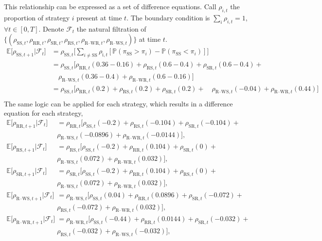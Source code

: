 This relationship can be expressed as a set of difference equations. Call $\rho_{i,t}$ the proportion of strategy $i$ present at time $t$. The boundary condition is $\sum_i \rho_{i,t}= 1$, $\forall t \in [0,T]$. Denote $\mathcal F_{t}$ the natural filtration of $\{(\rho_{\text{SS},t}, \rho_{\text{RR},t}, \rho_{\text{SR},t}, \rho_{\text{RS},t}, \rho_{\text{R--WR},t}, \rho_{\text{R--WS},t} ) \}$ at time $t$.  \\
\begin{align*}
    \mathbb E \big [\rho_{\text{SS},t+1}| \mathcal F_t \big ] &= \rho_{\text{SS},t} \Bigg [\sum_{ i \neq \text{SS}}  \rho_{\text{i},t} [\mathbb P (\pi_\text{SS} > \pi_{i}) -\mathbb P (\pi_\text{SS} < \pi_{i}) ] \Bigg ] \\
    &= \rho_{\text{SS},t}\Bigg [\rho_{\text{RR}, t}(0.36-0.16) + \rho_{\text{RS}, t}(0.6-0.4) + \rho_{\text{SR}, t}(0.6-0.4) + \\
     & \quad \rho_{\text{R--WS}, t}(0.36-0.4) + \rho_{\text{R--WR}, t}(0.6-0.16) \Bigg ] \\
    &= \rho_{\text{SS},t}\Bigg [\rho_{\text{RR}, t}(0.2) + \rho_{\text{RS}, t}(0.2) + \rho_{\text{SR}, t}(0.2) + 
      \quad \rho_{\text{R--WS}, t}(-0.04) + \rho_{\text{R--WR}, t}(0.44) \Bigg ] \\
\end{align*}
The same logic can be applied for each strategy, which results in a difference equation for each strategy, \\
\begin{align*}
    \mathbb E \big [\rho_{\text{RR},t+1}| \mathcal F_t \big ] &=\rho_{\text{RR},t}\Bigg [\rho_{\text{SS}, t}(-0.2) + \rho_{\text{RS}, t}(-0.104) +  \rho_{\text{SR}, t}(-0.104) + \\ & \rho_{\text{R--WS}, t}(-0.0896) + \rho_{\text{R--WR}, t}(-0.0144) \Bigg ], \\
    \mathbb E \big [\rho_{\text{RS},t+1}| \mathcal F_t \big ] &=\rho_{\text{RS},t}\Bigg [\rho_{\text{SS}, t}(-0.2) + \rho_{\text{RR}, t}(0.104) +  \rho_{\text{SR}, t}(0) + \\ & \rho_{\text{R--WS}, t}(0.072) + \rho_{\text{R--WR}, t}(0.032) \Bigg ] ,\\
    \mathbb E \big [\rho_{\text{SR},t+1}| \mathcal F_t \big ] &=\rho_{\text{SR},t}\Bigg [\rho_{\text{SS}, t}(-0.2) + \rho_{\text{RR}, t}(0.104) +  \rho_{\text{RS}, t}(0) + \\ & \rho_{\text{R--WS}, t}(0.072) + \rho_{\text{R--WR}, t}(0.032) \Bigg ] ,\\
    \mathbb E \big [\rho_{\text{R--WS},t+1}| \mathcal F_t \big ] &=\rho_{\text{R--WS},t}\Bigg [\rho_{\text{SS}, t}(0.04) + \rho_{\text{RR}, t}(0.0896) +  \rho_{\text{SR}, t}(-0.072) + \\ & \rho_{\text{RS}, t}(-0.072) + \rho_{\text{R--WR}, t}(0.032) \Bigg ] , \\
\mathbb E \big [\rho_{\text{R--WR},t+1}| \mathcal F_t \big ] &=\rho_{\text{R--WR},t}\Bigg [\rho_{\text{SS}, t}(-0.44) + \rho_{\text{RR}, t}(0.0144) +  \rho_{\text{SR}, t}(-0.032) + \\ & \rho_{\text{RS}, t}(-0.032) +\rho_{\text{R--WS}, t}(-0.032)  \Bigg ] , \\    
\end{align*}

